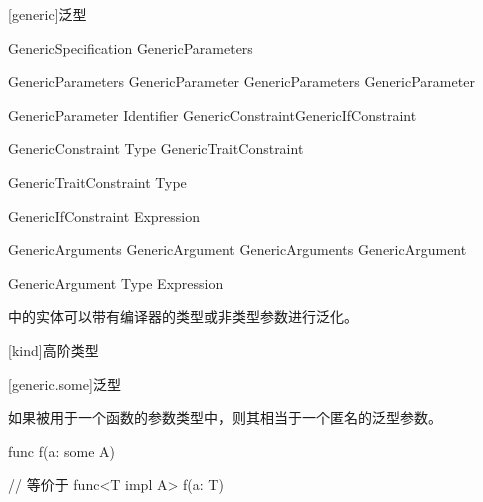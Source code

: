 
[generic]{泛型}

\begin{bnf}{GenericSpecification}
    \terminal{<} GenericParameters \terminal{>}
\end{bnf}

\begin{bnf}{GenericParameters}
    GenericParameter \br
    GenericParameters \terminal{,} GenericParameter
\end{bnf}

\begin{bnf}{GenericParameter}
    \bnfq Identifier \bnfq GenericConstraint\bnfq GenericIfConstraint\bnfq
\end{bnf}

\begin{bnf}{GenericConstraint}
    \terminal{:}  \br
    \terminal{:} Type \br
    GenericTraitConstraint
\end{bnf}

\begin{bnf}{GenericTraitConstraint}
     Type
\end{bnf}

\begin{bnf}{GenericIfConstraint}
     Expression
\end{bnf}

\begin{bnf}{GenericArguments}
    GenericArgument \br
    GenericArguments \terminal{,} GenericArgument
\end{bnf}

\begin{bnf}{GenericArgument}
    Type \br
    \bnfq Expression \br
     \terminal{_}
\end{bnf}

\pnum
\X 中的实体可以带有编译器的类型或非类型参数进行泛化。

[kind]{高阶类型}

[generic.some]{泛型}

\pnum
如果被用于一个函数的参数类型中，则其相当于一个匿名的泛型参数。

\enterexample
\begin{codeblock}

func f(a: some A) { }

// 等价于
func<T impl A> f(a: T) { }

\end{codeblock}
\exitexample

